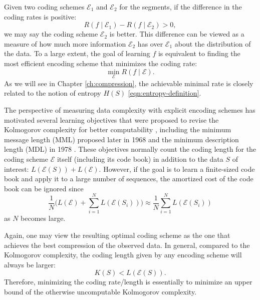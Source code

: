 \documentclass[\toplevelprefix/book-main.tex]{subfiles}
\begin{document}
Given two coding schemes $\mathcal{E}_1$ and $\mathcal{E}_2$ for the segments, if the difference in the coding rates is positive:
\begin{equation}
   R(f \mid \mathcal E_1) -  R(f \mid \mathcal E_2) > 0, 
\end{equation}
we may say the coding scheme $\mathcal{E}_2$ is better. This difference can be viewed as a measure of how much more information $\mathcal{E}_2$ has over $\mathcal{E}_1$ about the distribution of the data. To a large extent, the goal of learning $f$ is equivalent to finding the most efficient encoding scheme that minimizes the coding rate:
\begin{equation}
   \min_{\mathcal{E}} R(f \mid \mathcal E). 
\end{equation}
As we will see in Chapter \ref{ch:compression}, the achievable minimal rate is closely related to the notion of entropy $H(S)$ \eqref{eqn:entropy-definition}. 


\begin{remark}\label{rem:computable-complexity}
    {The perspective of measuring data complexity with explicit encoding schemes has motivated several learning objectives that were proposed to revise the Kolmogorov complexity for better computability \cite{WallaceC1999}, including the minimum message length (MML) proposed later in 1968 \cite{WallaceC1968} and the minimum description length (MDL) in 1978 \cite{Rissanen-1978,HansenM2001}. These objectives normally count the coding length for the coding scheme $\mathcal{E}$ itself (including its code book) in addition to the data $S$ of interest: $L(\mathcal E(S)) + L(\mathcal E)$.  However, if the goal is to learn a finite-sized code book and apply it to a large number of sequences, the amortized cost of the code book can be ignored since $$\frac{1}{N}\Big( L(\mathcal{E}) + \sum_{i=1}^N L(\mathcal{E}(S_i))\Big) \approx \frac{1}{N}\sum_{i=1}^N L(\mathcal{E}(S_i))$$ as $N$ becomes large.}
\end{remark}

Again, one may view the resulting optimal coding scheme as the one that achieves the best compression of the observed data. In general, compared to the Kolmogorov complexity, the coding length given by any encoding scheme will always be larger: 
\begin{equation}
    K(S) < L( \mathcal E(S)).
\end{equation} 
Therefore, minimizing the coding rate/length is essentially to minimize an upper bound of the otherwise uncomputable Kolmogorov complexity. 
\end{document}

